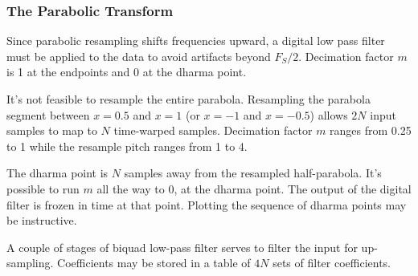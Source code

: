 \subsubsection{\label{sec:level1}The Parabolic Transform}

Since parabolic resampling shifts frequencies upward, a digital low pass filter
must be applied to the data to avoid artifacts beyond $F_S/2$.
Decimation factor $m$ is 1 at the endpoints and 0 at the dharma point.

It's not feasible to resample the entire parabola.
Resampling the parabola segment between $x=0.5$ and $x=1$ (or $x=-1$ and $x=-0.5$)
allows $2N$ input samples to map to $N$ time-warped samples.
Decimation factor $m$ ranges from 0.25 to 1
while the resample pitch ranges from 1 to 4.

The dharma point is $N$ samples away from the resampled half-parabola.
It's possible to run $m$ all the way to 0, at the dharma point.
The output of the digital filter is frozen in time at that point.
Plotting the sequence of dharma points may be instructive.

A couple of stages of biquad low-pass filter serves to filter the input for
up-sampling. 
Coefficients may be stored in a table of $4N$ sets of filter coefficients.


